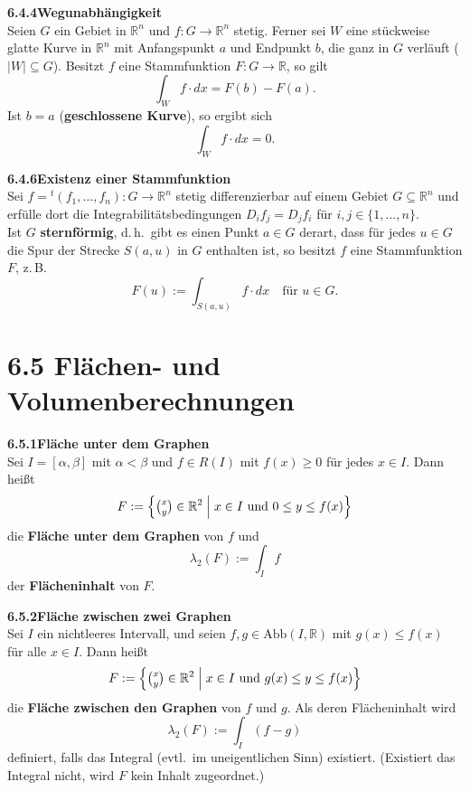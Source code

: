 \documentclass[a4paper,12pt]{article}
\newcommand{\gentry}[3]{%
  \noindent\textbf{#1\quad #2}\nopagebreak\\[0.2em]
  #3\par\smallskip
}
\begin{document}
\gentry{6.4.4}{Wegunabhängigkeit}{%
  Seien $G$ ein Gebiet in $\mathbb{R}^n$ und $f : G \longrightarrow \mathbb{R}^n$ stetig.
  Ferner sei $W$ eine stückweise glatte Kurve in $\mathbb{R}^n$ mit Anfangspunkt $a$ und
  Endpunkt $b$, die ganz in $G$ verläuft ($|W| \subseteq G$). Besitzt $f$ eine Stammfunktion
  $F : G \longrightarrow \mathbb{R}$, so gilt
  \[
    \int_W f \cdot dx = F(b) - F(a).
  \]
  Ist $b = a$ (\textbf{geschlossene Kurve}), so ergibt sich
  \[
    \int_W f \cdot dx = 0.
  \]
}

\gentry{6.4.6}{Existenz einer Stammfunktion}{%
  Sei $f = {}^t(f_1, \ldots, f_n) : G \longrightarrow \mathbb{R}^n$ stetig differenzierbar
  auf einem Gebiet $G \subseteq \mathbb{R}^n$ und erfülle dort die Integrabilitätsbedingungen
  $D_i f_j = D_j f_i$ für $i, j \in \{1, \ldots, n\}$.\\
  Ist $G$ \textbf{sternförmig}, d.\,h.\ gibt es einen Punkt $a \in G$ derart, dass für jedes
  $u \in G$ die Spur der Strecke $S(a, u)$ in $G$ enthalten ist, so besitzt $f$ eine
  Stammfunktion $F$, z.\,B.
  \[
    F(u) := \int_{S(a,u)} f \cdot dx \quad \text{für } u \in G.
  \]
}

\section*{6.5 \quad Flächen- und Volumenberechnungen}

\gentry{6.5.1}{Fläche unter dem Graphen}{%
  Sei $I = [\alpha, \beta]$ mit $\alpha < \beta$ und $f \in R(I)$ mit $f(x) \geq 0$ für
  jedes $x \in I$. Dann heißt
  \[
    F := \left\{ \tbinom{x}{y} \in \mathbb{R}^2 \;\middle|\; x \in I \text{ und } 0 \leq y \leq f(x) \right\}
  \]
  die \textbf{Fläche unter dem Graphen} von $f$ und
  \[
    \lambda_2(F) := \int_I f
  \]
  der \textbf{Flächeninhalt} von $F$.
}

\gentry{6.5.2}{Fläche zwischen zwei Graphen}{%
  Sei $I$ ein nichtleeres Intervall, und seien $f, g \in \mathrm{Abb}(I, \mathbb{R})$ mit
  $g(x) \leq f(x)$ für alle $x \in I$. Dann heißt
  \[
    F := \left\{ \tbinom{x}{y} \in \mathbb{R}^2 \;\middle|\; x \in I \text{ und } g(x) \leq y \leq f(x) \right\}
  \]
  die \textbf{Fläche zwischen den Graphen} von $f$ und $g$. Als deren Flächeninhalt
  wird
  \[
    \lambda_2(F) := \int_I (f - g)
  \]
  definiert, falls das Integral (evtl.\ im uneigentlichen Sinn) existiert. (Existiert das
  Integral nicht, wird $F$ kein Inhalt zugeordnet.)
}
\end{document}
